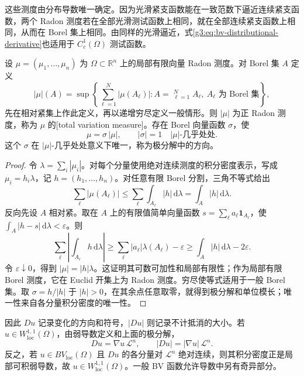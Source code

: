 这些测度由分布导数唯一确定。因为光滑紧支函数能在一致范数下逼近连续紧支函数，两个 Radon 测度若在全部光滑测试函数上相同，就在全部连续紧支函数上相同，从而在 Borel 集上相同。由同样的光滑逼近，式\eqref{g3:eq:bv-distributional-derivative}也适用于 \(C_c^1(\Omega)\) 测试函数。

\begin{lemma}\label{g3:lem:vector-measure-polar}
	设 \(\mu=(\mu_1,\ldots,\mu_n)\) 为 \(\Omega\subset\mathbb R^n\) 上的局部有限向量 Radon 测度。对 Borel 集 \(A\) 定义
	\[
		|\mu|(A)=
		\sup\left\{\sum_{\ell=1}^N|\mu(A_\ell)|:
		A=\mathop{\dot\bigcup}_{\ell=1}^NA_\ell,\ A_\ell\text{ 为 Borel 集}\right\},
	\]
	先在相对紧集上作此定义，再以递增穷尽定义一般情形。则 \(|\mu|\) 为正 Radon 测度，称为 \(\mu\) 的[total variation measure]。存在 Borel 向量函数 \(\sigma\)，使
	\begin{equation}\label{g3:eq:vector-measure-polar}
		\mu=\sigma\,|\mu|,\qquad |\sigma|=1
		\quad|\mu|\text{-几乎处处}.
	\end{equation}
	这个 \(\sigma\) 在 \(|\mu|\)-几乎处处意义下唯一，称为极分解中的方向。
\end{lemma}
\begin{proof}
	令 \(\lambda=\sum_i|\mu_i|\)。对每个分量使用绝对连续测度的积分密度表示，写成 \(\mu_i=h_i\lambda\)，记 \(h=(h_1,\ldots,h_n)\)。对任意有限 Borel 分割，三角不等式给出
	\[
		\sum_\ell|\mu(A_\ell)|
		\le\sum_\ell\int_{A_\ell}|h|\,\mathrm d\lambda
		=\int_A|h|\,\mathrm d\lambda.
	\]
	反向先设 \(A\) 相对紧。取在 \(A\) 上的有限值简单向量函数
	\(s=\sum_\ell a_\ell\mathbf1_{A_\ell}\)，使
	\(\int_A|h-s|\,\mathrm d\lambda<\varepsilon\)。则
	\[
		\sum_\ell\left|\int_{A_\ell}h\,\mathrm d\lambda\right|
		\ge\sum_\ell|a_\ell|\lambda(A_\ell)-\varepsilon
		\ge\int_A|h|\,\mathrm d\lambda-2\varepsilon.
	\]
	令 \(\varepsilon\downarrow0\)，得到 \(|\mu|=|h|\lambda\)。这证明其可数可加性和局部有限性；作为局部有限 Borel 测度，它在 Euclid 开集上为 Radon 测度。穷尽使等式适用于一般 Borel 集。取 \(\sigma=h/|h|\) 于 \(|h|>0\)，在其余点任意取零，就得到极分解和单位模长；唯一性来自各分量积分密度的唯一性。
\end{proof}

因此 \(Du\) 记录变化的方向和符号，\(|Du|\) 则记录不计抵消的大小。若 \(u\in W^{1,1}_{\mathrm{loc}}(\Omega)\)，由弱导数定义和上面的极分解，
\[
	Du=\nabla u\,\mathcal L^n,\qquad
	|Du|=|\nabla u|\,\mathcal L^n.
\]
反之，若 \(u\in BV_{\mathrm{loc}}(\Omega)\) 且 \(Du\) 的各分量对 \(\mathcal L^n\) 绝对连续，则其积分密度正是局部可积弱导数，故 \(u\in W^{1,1}_{\mathrm{loc}}(\Omega)\)。一般 BV 函数允许导数中另有奇异部分。

